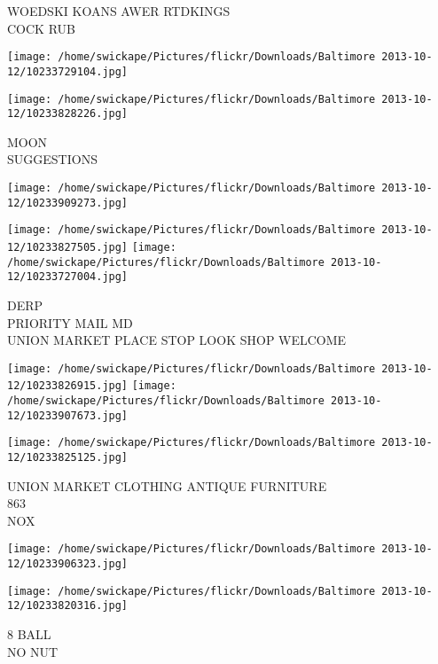 \documentclass[10pt,letterpaper]{article}
\begin{document}
WOEDSKI KOANS AWER RTDKINGS\\
COCK RUB
\pagebreak

\texttt{[image: /home/swickape/Pictures/flickr/Downloads/Baltimore 2013-10-12/10233729104.jpg]}

\vspace{0.25in}
\texttt{[image: /home/swickape/Pictures/flickr/Downloads/Baltimore 2013-10-12/10233828226.jpg]}

MOON\\
SUGGESTIONS
\pagebreak

\texttt{[image: /home/swickape/Pictures/flickr/Downloads/Baltimore 2013-10-12/10233909273.jpg]}

\vspace{0.25in}
\texttt{[image: /home/swickape/Pictures/flickr/Downloads/Baltimore 2013-10-12/10233827505.jpg]}
\texttt{[image: /home/swickape/Pictures/flickr/Downloads/Baltimore 2013-10-12/10233727004.jpg]}

DERP\\
PRIORITY MAIL MD\\
UNION MARKET PLACE STOP LOOK SHOP WELCOME
\pagebreak

\texttt{[image: /home/swickape/Pictures/flickr/Downloads/Baltimore 2013-10-12/10233826915.jpg]}
\texttt{[image: /home/swickape/Pictures/flickr/Downloads/Baltimore 2013-10-12/10233907673.jpg]}

\vspace{0.25in}
\texttt{[image: /home/swickape/Pictures/flickr/Downloads/Baltimore 2013-10-12/10233825125.jpg]}

UNION MARKET CLOTHING ANTIQUE FURNITURE\\
863\\
NOX
\pagebreak

\texttt{[image: /home/swickape/Pictures/flickr/Downloads/Baltimore 2013-10-12/10233906323.jpg]}

\vspace{0.25in}
\texttt{[image: /home/swickape/Pictures/flickr/Downloads/Baltimore 2013-10-12/10233820316.jpg]}

8 BALL\\
NO NUT
\pagebreak
\end{document}
